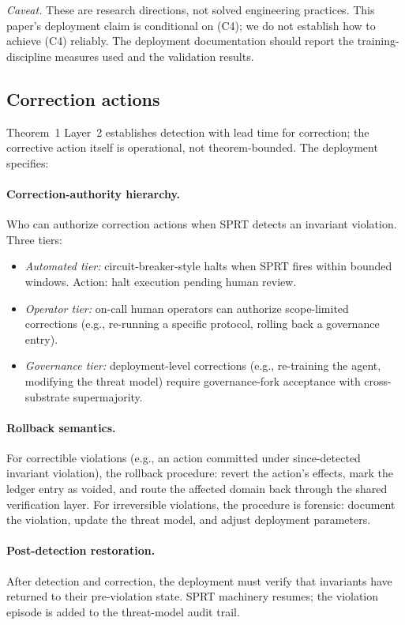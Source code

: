 \emph{Caveat.} These are research directions, not solved engineering
practices. This paper's deployment claim is conditional on (C4); we
do not establish how to achieve (C4) reliably. The deployment
documentation should report the training-discipline measures used
and the validation results.

\subsection{Correction actions}
\label{sec:tooling_correction}

Theorem~1 Layer~2 establishes detection with lead time for
correction; the corrective action itself is operational, not
theorem-bounded. The deployment specifies:

\paragraph{Correction-authority hierarchy.}
Who can authorize correction actions when SPRT detects an invariant
violation. Three tiers:
\begin{itemize}
\item \emph{Automated tier:} circuit-breaker-style halts when SPRT
  fires within bounded windows. Action: halt execution pending
  human review.
\item \emph{Operator tier:} on-call human operators can authorize
  scope-limited corrections (e.g., re-running a specific protocol,
  rolling back a governance entry).
\item \emph{Governance tier:} deployment-level corrections (e.g.,
  re-training the agent, modifying the threat model) require
  governance-fork acceptance with cross-substrate supermajority.
\end{itemize}

\paragraph{Rollback semantics.}
For correctible violations (e.g., an action committed under
since-detected invariant violation), the rollback procedure: revert
the action's effects, mark the ledger entry as voided, and route
the affected domain back through the shared verification layer.
For irreversible violations, the procedure is forensic: document
the violation, update the threat model, and adjust deployment
parameters.

\paragraph{Post-detection restoration.}
After detection and correction, the deployment must verify that
invariants have returned to their pre-violation state. SPRT
machinery resumes; the violation episode is added to the
threat-model audit trail.

